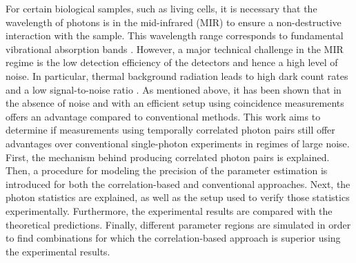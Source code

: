For certain biological samples, such as living cells, it is necessary that the wavelength of photons is in the mid-infrared (MIR) to ensure a non-destructive interaction with the sample. This wavelength range corresponds to fundamental vibrational absorption bands \cite{katoLabelfreeVisualizationPhotosynthetic2023,ishiganeLabelfreeMidinfraredPhotothermal2023}. However, a major technical challenge in the MIR regime is the low detection efficiency of the detectors and hence a high level of noise. In particular, thermal background radiation leads to high dark count rates and a low signal-to-noise ratio \cite{SingleQuantumExcellence}. \newline
As mentioned above, it has been shown that in the absence of noise and with an efficient setup using coincidence measurements offers an advantage compared to conventional methods. This work aims to determine if measurements using temporally correlated photon pairs still offer advantages over conventional single-photon experiments in regimes of large noise. \newline
First, the mechanism behind producing correlated photon pairs is explained. Then, a procedure for modeling the precision of the parameter estimation is introduced for both the correlation-based and conventional approaches. Next, the photon statistics are explained, as well as the setup used to verify those statistics experimentally. Furthermore, the experimental results are compared with the theoretical predictions. Finally, different parameter regions are simulated in order to find combinations for which the correlation-based approach is superior using the experimental results.







